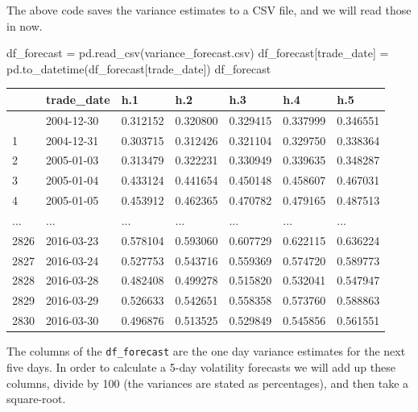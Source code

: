 \documentclass[
  letterpaper,
  DIV=11,
  numbers=noendperiod]{scrreprt}
\newenvironment{Shaded}{\begin{snugshade}}{\end{snugshade}}
\newcommand{\NormalTok}[1]{\textcolor[rgb]{0.00,0.23,0.31}{#1}}
\newcommand{\OperatorTok}[1]{\textcolor[rgb]{0.37,0.37,0.37}{#1}}
\newcommand{\StringTok}[1]{\textcolor[rgb]{0.13,0.47,0.30}{#1}}
\begin{document}
The above code saves the variance estimates to a CSV file, and we will
read those in now.

\begin{Shaded}
\begin{Highlighting}[]
\NormalTok{df\_forecast }\OperatorTok{=}\NormalTok{ pd.read\_csv(}\StringTok{\textquotesingle{}variance\_forecast.csv\textquotesingle{}}\NormalTok{)}
\NormalTok{df\_forecast[}\StringTok{\textquotesingle{}trade\_date\textquotesingle{}}\NormalTok{] }\OperatorTok{=}\NormalTok{ pd.to\_datetime(df\_forecast[}\StringTok{\textquotesingle{}trade\_date\textquotesingle{}}\NormalTok{])}
\NormalTok{df\_forecast}
\end{Highlighting}
\end{Shaded}

\begin{longtable}[]{@{}lllllll@{}}
\toprule\noalign{}
& trade\_date & h.1 & h.2 & h.3 & h.4 & h.5 \\
\midrule\noalign{}
\endhead
\bottomrule\noalign{}
\endlastfoot
0 & 2004-12-30 & 0.312152 & 0.320800 & 0.329415 & 0.337999 & 0.346551 \\
1 & 2004-12-31 & 0.303715 & 0.312426 & 0.321104 & 0.329750 & 0.338364 \\
2 & 2005-01-03 & 0.313479 & 0.322231 & 0.330949 & 0.339635 & 0.348287 \\
3 & 2005-01-04 & 0.433124 & 0.441654 & 0.450148 & 0.458607 & 0.467031 \\
4 & 2005-01-05 & 0.453912 & 0.462365 & 0.470782 & 0.479165 & 0.487513 \\
... & ... & ... & ... & ... & ... & ... \\
2826 & 2016-03-23 & 0.578104 & 0.593060 & 0.607729 & 0.622115 &
0.636224 \\
2827 & 2016-03-24 & 0.527753 & 0.543716 & 0.559369 & 0.574720 &
0.589773 \\
2828 & 2016-03-28 & 0.482408 & 0.499278 & 0.515820 & 0.532041 &
0.547947 \\
2829 & 2016-03-29 & 0.526633 & 0.542651 & 0.558358 & 0.573760 &
0.588863 \\
2830 & 2016-03-30 & 0.496876 & 0.513525 & 0.529849 & 0.545856 &
0.561551 \\
\end{longtable}

The columns of the \texttt{df\_forecast} are the one day variance
estimates for the next five days. In order to calculate a 5-day
volatility forecasts we will add up these columns, divide by 100 (the
variances are stated as percentages), and then take a square-root.
\end{document}

